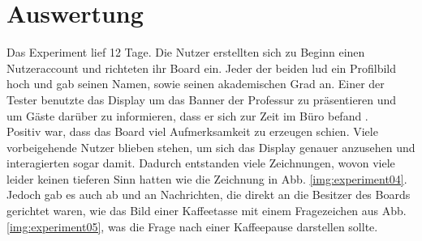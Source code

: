 \section{Auswertung}\label{Auswertung}
Das Experiment lief 12 Tage. Die Nutzer erstellten sich zu Beginn einen Nutzeraccount und richteten ihr Board ein. Jeder der beiden lud ein Profilbild hoch und gab seinen Namen, sowie seinen akademischen Grad an.
Einer der Tester benutzte das Display um das Banner der Professur zu präsentieren  und um Gäste \bspw darüber zu informieren, dass er sich zur Zeit im Büro befand .
\\
Positiv war, dass das Board viel Aufmerksamkeit zu erzeugen schien. Viele vorbeigehende Nutzer blieben stehen, um sich das Display genauer anzusehen und interagierten sogar damit. Dadurch entstanden viele Zeichnungen, wovon viele leider keinen tieferen Sinn hatten wie \bspw die Zeichnung in Abb. \ref{img:experiment04}. Jedoch gab es auch ab und an Nachrichten, die direkt an die Besitzer des Boards gerichtet waren, wie das Bild einer Kaffeetasse mit einem Fragezeichen aus Abb. \ref{img:experiment05}, was die Frage nach einer Kaffeepause darstellen sollte.
